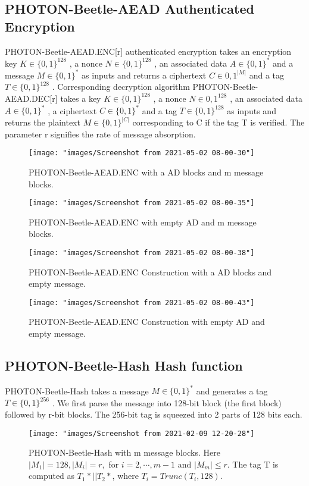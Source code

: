 \documentclass{article}
\begin{document}
\subsection{PHOTON-Beetle-AEAD Authenticated Encryption}
PHOTON-Beetle-AEAD.ENC[r] authenticated encryption takes an encryption key $K \in \{0, 1\}^{128}$ , a nonce $N \in \{0, 1\}^{128}$ , an associated data $A \in \{0, 1\}^ *$ and a message $M \in \{0, 1\}^*$ as inputs and returns a ciphertext $C \in {0, 1}^{|M|}$ and a tag $T \in \{0, 1\}^{128}$ . Corresponding decryption algorithm PHOTON-Beetle-AEAD.DEC[r] takes a key $K \in \{0, 1\}^{128}$ , a nonce $N \in {0, 1}^{128}$ , an associated data $A \in \{0, 1\}^ *$ , a ciphertext $C \in \{0, 1\}^*$
and a tag $T \in \{0, 1\}^{128}$ as inputs and returns the plaintext $M \in \{0, 1\}^{|C|}$ corresponding to C if the tag T is verified. The parameter r signifies the rate of message absorption.
\begin{figure}
	\centering
	\texttt{[image: "images/Screenshot from 2021-05-02 08-00-30"]}
	\caption{PHOTON-Beetle-AEAD.ENC with a AD blocks and m message blocks.}
	\label{fig:screenshot-from-2021-05-02-08-00-30}
\end{figure}
\begin{figure}
	\centering
	\texttt{[image: "images/Screenshot from 2021-05-02 08-00-35"]}
	\caption{PHOTON-Beetle-AEAD.ENC with empty AD and m message blocks.}
	\label{fig:screenshot-from-2021-05-02-08-00-35}
\end{figure}
\begin{figure}
	\centering
	\texttt{[image: "images/Screenshot from 2021-05-02 08-00-38"]}
	\caption{PHOTON-Beetle-AEAD.ENC Construction with a AD blocks and empty message.}
	\label{fig:screenshot-from-2021-05-02-08-00-38}
\end{figure}
\begin{figure}
	\centering
	\texttt{[image: "images/Screenshot from 2021-05-02 08-00-43"]}
	\caption{PHOTON-Beetle-AEAD.ENC Construction with empty AD and empty message.}
	\label{fig:screenshot-from-2021-05-02-08-00-43}
\end{figure}
\newpage
\subsection{PHOTON-Beetle-Hash Hash function}
PHOTON-Beetle-Hash takes a message $M \in \{0, 1\}^*$ and generates a tag $T \in \{0, 1\}^{256}$ . We first parse the message into 128-bit block (the first block) followed by r-bit blocks. The 256-bit tag is squeezed into 2 parts of 128 bits each.
\begin{figure}
	\centering
	\texttt{[image: "images/Screenshot from 2021-02-09 12-20-28"]}
	\caption{PHOTON-Beetle-Hash with m message blocks. Here $|M_1| = 128, |M_i| = r,$ for $i = 2, \cdots , m - 1$ and $|M_m|\le r$. The tag T is computed as $T_1* || T_2*$, where $T_i = Trunc(T_i,128).$}
	\label{fig:screenshot-from-2021-02-09-12-20-28}
\end{figure}
\end{document}
